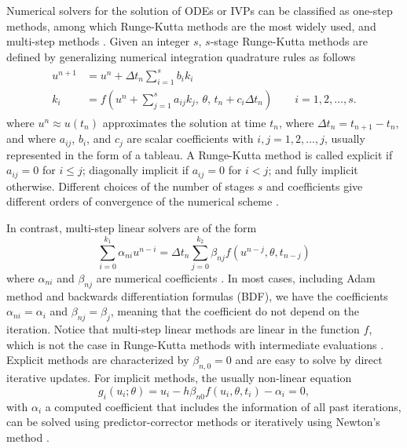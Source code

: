 Numerical solvers for the solution of ODEs or IVPs can be classified as one-step methods, among which Runge-Kutta methods are the most widely used, and multi-step methods \cite{hairer-solving-1}.
Given an integer $s$, $s$-stage Runge-Kutta methods are defined by generalizing numerical integration quadrature rules as follows
\begin{align}
\begin{split}
    u^{n+1} 
    &= 
    u^n 
    + 
    \Delta t_n \sum_{i=1}^s b_i k_i \\
    k_i 
    &= 
    f \left(u^n + \sum_{j=1}^s a_{ij} k_j , \, \theta , \, t_n + c_i \Delta t_n \right) \qquad i=1,2, \ldots, s.
    \label{eq:Runge-Kutta-scheme}
\end{split}
\end{align}
where $u^{n} \approx u(t_n)$ approximates the solution at time $t_n$, where $\Delta t_n = t_{n+1}-t_n$, and where $a_{ij}$, $b_i$, and $c_j$ are scalar coefficients with $i,j=1, 2,\ldots, j$, usually represented in the form of a tableau. 
A Runge-Kutta method is called explicit if $a_{ij}=0$ for $i \leq j$; diagonally implicit if $a_{ij}=0$ for $i < j$; and fully implicit otherwise. 
Different choices of the number of stages $s$ and coefficients give different orders of convergence of the numerical scheme \cite{Butcher_Wanner_1996, Butcher_2001}. 

In contrast, multi-step linear solvers are of the form 
\begin{equation}
    \sum_{i=0}^{k_1} \alpha_{ni} u^{n-i} 
    =
    \Delta t_n \sum_{j=0}^{k_2} \beta_{nj} f(u^{n-j}, \theta, t_{n-j})
\end{equation}
where $\alpha_{ni}$ and $\beta_{nj}$ are numerical coefficients \cite{hairer-solving-1}.
In most cases, including Adam method and backwards differentiation formulas (BDF), we have the coefficients $\alpha_{ni} = \alpha_i$ and $\beta_{nj}=\beta_j$, meaning that the coefficient do not depend on the iteration. 
Notice that multi-step linear methods are linear in the function $f$, which is not the case in Runge-Kutta methods with intermediate evaluations \cite{ascher2008numerical}.
Explicit methods are characterized by $\beta_{n, 0} = 0$ and are easy to solve by direct iterative updates. 
For implicit methods, the usually non-linear equation 
\begin{equation}
    g_i(u_i; \theta) = u_i - h \beta_{n0} f(u_i, \theta, t_i) - \alpha_i = 0,
    \label{eq:solver-constriant-example}
\end{equation}
with $\alpha_i$ a computed coefficient that includes the information of all past iterations, can be solved using predictor-corrector methods \cite{hairer-solving-1} or iteratively using Newton's method \cite{SUNDIALS-hindmarsh2005sundials}.  

